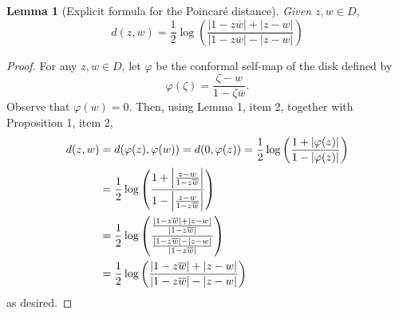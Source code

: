 \documentclass[10pt]{article}
\theoremstyle{plain}
\newtheorem{lemma}{Lemma}
\begin{document}
		\begin{lemma}[Explicit formula for the Poincaré distance]
			Given $z, w \in D$, $$\boxed{d(z, w) = \frac{1}{2} \log \left(\frac{|1 - z \overline{w}| + |z - w|}{|1 - z \overline{w}| - |z - w|}\right)}$$
		\end{lemma}
			\begin{proof}
				For any $z, w \in D$, let $\varphi$ be the conformal self-map of the disk defined by $$\varphi(\zeta) = \frac{\zeta - w}{1 - \zeta \overline{w}}.$$ Observe that $\varphi(w) = 0$. Then, using Lemma 1, item 2, together with Proposition 1, item 2,  
					\begin{align*}
						d(z, w) &= d(\varphi(z), \varphi(w)) = d(0, \varphi(z)) = \frac{1}{2} \log \left(\frac{1 + |\varphi(z)|}{1 - |\varphi(z)|}\right) \\
						&= \frac{1}{2} \log \left(\frac{1 + \abs{\frac{z - w}{1 - z \overline{w}}}}{1 - \abs{\frac{z - w}{1 - z \overline{w}}}}\right) \\
						&= \frac{1}{2} \log \left(\frac{\frac{|1 - z \overline{w}| + |z - w|}{|1 - z \overline{w}|}}{\frac{|1 - z \overline{w}| - |z - w|}{|1 - z \overline{w}|}}\right) \\
						&= \frac{1}{2} \log \left(\frac{|1 - z \overline{w}| + |z - w|}{|1 - z \overline{w}| - |z - w|}\right)
					\end{align*}
				as desired. 
			\end{proof}
	
\end{document}

